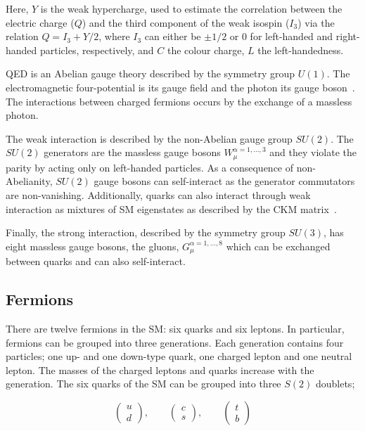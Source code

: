 			\noindent Here, $Y$ is the weak hypercharge, used to estimate the correlation between the electric charge ($Q$) and the third component of the weak isospin ($I_3$) via the relation $Q = I_3 + Y/2$, where $I_3$ can either be $\pm 1/2$ or $0$ for left-handed and right-handed particles, respectively, and $C$ the colour charge, $L$ the left-handedness. 


			\ac{QED} is an Abelian gauge theory described by the symmetry group $U(1)$. The electromagnetic four-potential is its gauge field and the photon its gauge boson~\cite{Pich2012}. The interactions between charged fermions occurs by the exchange of a massless photon. 

			The weak interaction is described by the non-Abelian gauge group $SU(2)$. The $SU(2)$ generators are the massless gauge bosons $W_{\mu}^{\alpha = 1,\dots,3}$ and they violate the parity by acting only on left-handed particles. As a consequence of non-Abelianity, $SU(2)$ gauge bosons can self-interact as the generator commutators are non-vanishing. Additionally, quarks can also interact through weak interaction as mixtures of \ac{SM} eigenstates as described by the CKM matrix~\cite{Olive2014}.

			Finally, the strong interaction, described by the symmetry group $SU(3)$, has eight massless gauge bosons, the gluons, $G_{\mu}^{\alpha=1,\dots,8}$ which can be exchanged between quarks and can also self-interact. 



		\subsection*{Fermions}

			There are twelve fermions in the \ac{SM}: six quarks and six leptons. In particular, fermions can be grouped into three generations. Each generation contains four particles; one up- and one down-type quark, one charged lepton and one neutral lepton. The masses of the charged leptons and quarks increase with the generation. The six quarks of the \ac{SM} can be grouped into three $S(2)$ doublets;

			\begin{equation*}
			\label{eq:quark_doublets}
				\begin{pmatrix} u \\ d \end{pmatrix}, \qquad 
				\begin{pmatrix} c \\ s \end{pmatrix}, \qquad 
				\begin{pmatrix} t \\ b \end{pmatrix}
			\end{equation*}

